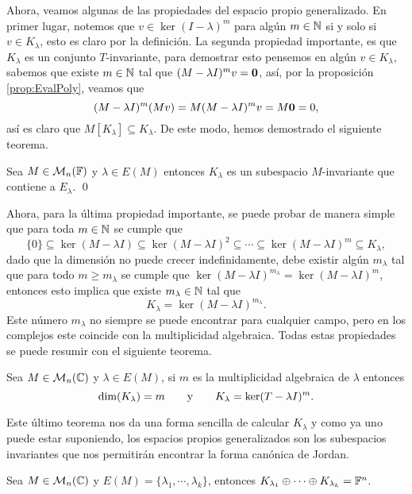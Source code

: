 Ahora, veamos algunas de las propiedades del espacio propio generalizado. En primer lugar, notemos que $v \in \ker(I-\lambda)^m$ para algún $m \in \mathbb{N}$ si y solo si $v \in K_\lambda$, esto es claro por la definición. La segunda propiedad importante, es que $K_\lambda$ es un conjunto $T$-invariante, para demostrar esto pensemos en algún $v \in K_\lambda$, sabemos que existe $m\in\mathbb{N}$ tal que $(M-\lambda I)^mv = \mathbf{0}$, así, por la proposición \ref{prop:EvalPoly}, veamos que
\[ (M-\lambda I)^m (Mv) = M(M-\lambda I)^m v = M\mathbf{0} = 0,\]
así es claro que $M[K_\lambda] \subseteq K_\lambda$. De este modo, hemos demostrado el siguiente teorema.

\begin{teor}
  Sea $M \in \mathcal{M}_n(\mathbb{F})$ y $\lambda \in E(M)$ entonces $K_\lambda$ es un subespacio $M$-invariante que contiene a $E_\lambda$. \qed
\end{teor}

Ahora, para la última propiedad importante, se puede probar de manera simple que para toda $m \in \mathbb{N}$ se cumple que
\[
  \{0\} \subseteq \ker(M-\lambda I) \subseteq \ker(M-\lambda I)^2 \subseteq \cdots \subseteq \ker(M-\lambda I)^m \subseteq K_\lambda,
\]
dado que la dimensión no puede crecer indefinidamente, debe existir algún $m_\lambda$ tal que para todo $m \geq m_\lambda$ se cumple que $\ker(M-\lambda I)^{m_\lambda} = \ker(M-\lambda I)^m$, entonces esto implica que existe $m_\lambda \in \mathbb{N}$ tal que
\[ K_\lambda = \ker(M-\lambda I)^{m_\lambda}.\]
Este número $m_\lambda$ no siempre se puede encontrar para cualquier campo, pero en los complejos este coincide con la multiplicidad algebraica. Todas estas propiedades se puede resumir con el siguiente teorema.

\begin{teor}
  Sea $M \in \mathcal{M}_n(\mathbb{C})$ y $\lambda \in E(M)$, si $m$ es la multiplicidad algebraica de $\lambda$ entonces
\[  \dim(K_{\lambda}) = m \qquad\text{y}\qquad K_\lambda = \ker(T-\lambda I)^m. \]
\end{teor}

Este último teorema nos da una forma sencilla de calcular $K_\lambda$ y como ya uno puede estar suponiendo, los espacios propios generalizados son los subespacios invariantes que nos permitirán encontrar la forma canónica de Jordan.

\begin{teor}
  Sea $M \in \mathcal{M}_n(\mathbb{C})$ y $E(M) = \{\lambda_1, \cdots, \lambda_k\}$, entonces $K_{\lambda_1} \oplus \cdots \oplus K_{\lambda_k} = \mathbb{F}^n$.
\end{teor}

